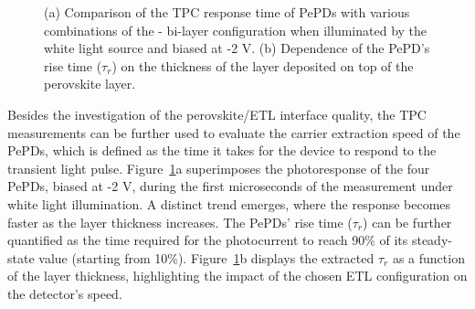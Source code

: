 \begin{figure}[ht!]
    \caption[Comparison of the TPC response time of PePDs with various combinations of the - bi-layer configuration and dependence of the PePD's rise time ($\tau_r$) on the thickness of the  layer.]{(a) Comparison of the TPC response time of PePDs with various combinations of the - bi-layer configuration when illuminated by the white light source and biased at -2 V. (b) Dependence of the PePD's rise time ($\tau_r$) on the thickness of the  layer deposited on top of the perovskite layer.}
    \label{fig:etl_opt:rise_time}
\end{figure}

Besides the investigation of the perovskite/ETL interface quality, the TPC measurements can be further used to evaluate the carrier extraction speed of the PePDs, which is defined as the time it takes for the device to respond to the transient light pulse. Figure~\ref{fig:etl_opt:rise_time}a superimposes the photoresponse of the four PePDs, biased at -2 V, during the first microseconds of the measurement under white light illumination. A distinct trend emerges, where the response becomes faster as the  layer thickness increases. The PePDs' rise time ($\tau_r$) can be further quantified as the time required for the photocurrent to reach 90\% of its steady-state value (starting from 10\%). Figure~\ref{fig:etl_opt:rise_time}b displays the extracted $\tau_r$ as a function of the  layer thickness, highlighting the impact of the chosen ETL configuration on the detector's speed.  

